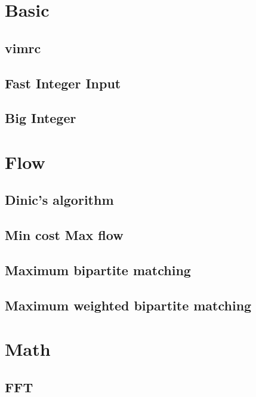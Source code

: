 \documentclass[a4paper,10pt,twocolumn,oneside]{article}
\begin{document}
\pagestyle{fancy}
\fancyfoot{}
\fancyhead[R]{\thepage}
\renewcommand{\headrulewidth}{0.4pt}
\renewcommand{\contentsname}{Contents} 

\scriptsize
\tableofcontents
\newpage
\section{Basic}
\subsection{vimrc}

\subsection{Fast Integer Input}

\subsection{Big Integer}

\section{Flow}
\subsection{Dinic's algorithm}

\subsection{Min cost Max flow}

\subsection{Maximum bipartite matching}

\subsection{Maximum weighted bipartite matching}

\section{Math}
\subsection{FFT}

\end{document}
